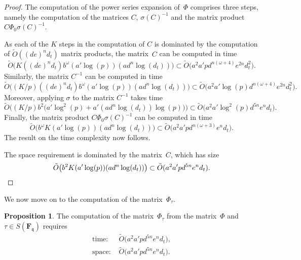 \documentclass[a4paper,11pt]{article}
\numberwithin{equation}{section}
\newcommand{\FF}{\mathbf{F}} %
\providecommand{\SoftOh}{\tilde{O}} %
\theoremstyle{definition}
\newtheorem{prop}[thm]{Proposition}
\begin{document}
\begin{proof}
The computation of the power series expansion of~$\Phi$ comprises 
three steps, namely the computation of the matrices $C$, $\sigma(C)^{-1}$ 
and the matrix product $C \Phi_0 \sigma(C)^{-1}$.

As each of the $K$ steps in the computation of $C$ is dominated by the 
computation of $\SoftOh((de)^n d_t)$ matrix products, the matrix~$C$ can be 
computed in time 
\begin{equation*}
\SoftOh\bigl(K ((de)^n d_t) b^{\omega} (a' \log (p)) (a d^n \log (d_t))\bigr) 
    \subset \SoftOh\bigl(a^2 a' p d^{n(\omega + 4)} e^{2n} d_t^2 \bigr).
\end{equation*}
Similarly, the matrix $C^{-1}$ can be computed in time 
\begin{equation*}
\SoftOh\bigl( (K/p) ((de)^n d_t) b^{\omega} (a' \log (p)) (ad^n \log (d_t)) \bigr)
    \subset \SoftOh\bigl( a^2 a' \log(p) d^{n(\omega+4)} e^{2n} d_t^2 \bigr). 
\end{equation*}
Moreover, applying $\sigma$ to the matrix $C^{-1}$ takes time 
\begin{equation*}
\SoftOh\bigl( (K/p) b^2 \bigl(a' \log^2(p) + a' (a d^n \log(d_t)) \log(p) \bigl) \bigr)
\subset \SoftOh\bigl( a^2 a' \log^2(p) d^{5n} e^n d_t \bigr).
\end{equation*}
Finally, the matrix product 
$C \Phi_0 \sigma(C)^{-1}$ can be computed in time 
\begin{equation*}
\SoftOh\bigl( b^{\omega} K (a' \log(p)) (a d^n \log(d_t)) \bigr) 
    \subset \SoftOh\bigl( a^2 a' p d^{n(\omega + 3)} e^n d_t \bigr).
\end{equation*}
The result on the time complexity now follows.

The space requirement is dominated by the matrix~$C$, which has size
\begin{equation*}
\SoftOh\bigl(b^2 K (a' \log(p)) (a d^n \log(d_t))\bigr) 
    \subset \SoftOh(a^2 a' p d^{5n} e^n d_t). \qedhere
\end{equation*}
\end{proof}

We now move on to the computation of the matrix~$\Phi_{\tau}$.

\begin{prop}
The computation of the matrix~$\Phi_{\tau}$ from the matrix~$\Phi$ 
and $\tau \in S(\FF_{\mathfrak{q}})$ requires
\begin{align*}
\mbox{time: }  &\SoftOh\bigl(a^2 a' p d^{5n} e^n d_t \bigr), \\ 
\mbox{space: } &\SoftOh\bigl(a^2 a' p d^{5n} e^n d_t \bigr).
\end{align*}
\end{prop}
\end{document}
